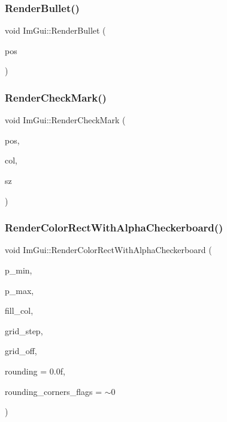 \subsubsection{\texorpdfstring{Render\+Bullet()}{RenderBullet()}}
{\footnotesize\ttfamily void Im\+Gui\+::\+Render\+Bullet (\begin{DoxyParamCaption}\item[{\hyperlink{struct_im_vec2}{Im\+Vec2}}]{pos }\end{DoxyParamCaption})}

\hypertarget{namespace_im_gui_a6adfc430445ed42a65556ffb0d58a8b8}{}\label{namespace_im_gui_a6adfc430445ed42a65556ffb0d58a8b8} 
\subsubsection{\texorpdfstring{Render\+Check\+Mark()}{RenderCheckMark()}}
{\footnotesize\ttfamily void Im\+Gui\+::\+Render\+Check\+Mark (\begin{DoxyParamCaption}\item[{\hyperlink{struct_im_vec2}{Im\+Vec2}}]{pos,  }\item[{Im\+U32}]{col,  }\item[{float}]{sz }\end{DoxyParamCaption})}

\hypertarget{namespace_im_gui_a4715686ee0c613e8518c0f5e92c358ce}{}\label{namespace_im_gui_a4715686ee0c613e8518c0f5e92c358ce} 
\subsubsection{\texorpdfstring{Render\+Color\+Rect\+With\+Alpha\+Checkerboard()}{RenderColorRectWithAlphaCheckerboard()}}
{\footnotesize\ttfamily void Im\+Gui\+::\+Render\+Color\+Rect\+With\+Alpha\+Checkerboard (\begin{DoxyParamCaption}\item[{\hyperlink{struct_im_vec2}{Im\+Vec2}}]{p\+\_\+min,  }\item[{\hyperlink{struct_im_vec2}{Im\+Vec2}}]{p\+\_\+max,  }\item[{Im\+U32}]{fill\+\_\+col,  }\item[{float}]{grid\+\_\+step,  }\item[{\hyperlink{struct_im_vec2}{Im\+Vec2}}]{grid\+\_\+off,  }\item[{float}]{rounding = {\ttfamily 0.0f},  }\item[{int}]{rounding\+\_\+corners\+\_\+flags = {\ttfamily $\sim$0} }\end{DoxyParamCaption})}

